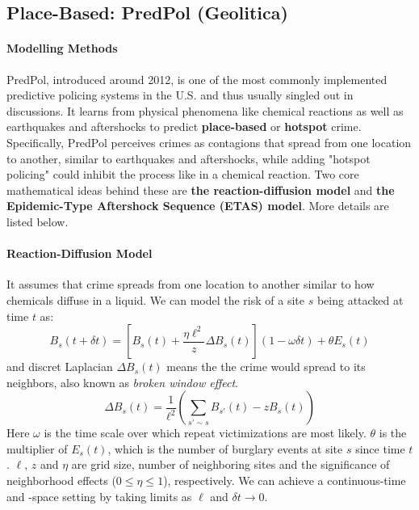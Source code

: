 \documentclass{article}
\begin{document}
\subsection{Place-Based: PredPol (Geolitica)}
\paragraph{Modelling Methods} PredPol\cite{ferguson2017rise,ensign2017runaway}, introduced around 2012, is one of the most commonly implemented predictive policing systems in the U.S.\cite{pechini1967washington} and thus usually singled out in discussions. It learns from physical phenomena like chemical reactions as well as earthquakes and aftershocks to predict \textbf{place-based} or \textbf{hotspot} crime. Specifically, PredPol perceives crimes as contagions that spread from one location to another, similar to earthquakes and aftershocks, while adding "hotspot policing" could inhibit the process like in a chemical reaction. 
Two core mathematical ideas behind these are \textbf{the reaction-diffusion model}\cite{react-diff-short2008statistical,react-diff-short2010nonlinear} and \textbf{the Epidemic-Type Aftershock Sequence (ETAS) model}\cite{ETAS_ogata1988statistical}. More details are listed below.

\paragraph{Reaction-Diffusion Model\cite{react-diff-short2008statistical,react-diff-short2010nonlinear}} 
It assumes that crime spreads from one location to another similar to how chemicals diffuse in a liquid. We can model the risk of a site $s$ being attacked at time $t$ as:
\begin{equation}
    B_s(t + \delta t) = \left[ B_s(t) + \frac{\eta \ell^2}{z} \Delta B_s(t) \right] (1 - \omega \delta t) + \theta E_s(t)
\end{equation}
and discret Laplacian $\Delta B_s(t)$ means the the crime would spread to its neighbors, also known as \textit{broken window effect}.
\begin{equation}
    \Delta B_s(t) = \frac{1}{\ell^2} \left( \sum_{s' \sim s} B_{s'}(t) - z B_s(t) \right)
\end{equation}
Here $\omega$ is the time scale over which repeat victimizations are most likely. $\theta$ is the multiplier of $E_s(t)$, which is the number of burglary events at site $s$ since time $t$. $\ell$, $z$ and $\eta$ are grid size, number of neighboring sites and the significance of neighborhood effects ($0 \leq \eta \leq 1$), respectively. We can achieve a continuous-time and -space setting by taking limits as $\ell$ and $\delta t \to 0$.
\end{document}
